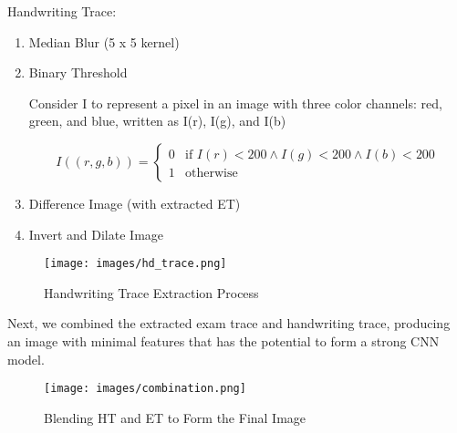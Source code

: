 \documentclass[pmlr,twocolumn,10pt,breaklinks, x11names,table]{jmlr} %
\begin{document}
\vfill\eject

Handwriting Trace:

\begin{enumerate}
\item Median Blur (5 x 5 kernel)
\item Binary Threshold

Consider I to represent a pixel in an image with three color channels: red, green, and blue, written as I(r), I(g), and I(b)

\[I((r, g, b)) = \begin{cases} 
    0 & \text{if } I(r) < 200 \land I(g) < 200 \land I(b) < 200 \\
    1 & \text{otherwise}
\end{cases}\]

\item Difference Image (with extracted ET)
\item Invert and Dilate Image
\end{enumerate}

\begin{figure}[h] 
\label{fig: fig3}
\centering 
\texttt{[image: images/hd\_trace.png]}
\caption{Handwriting Trace Extraction Process}
\end{figure}

\clearpage

Next, we combined the extracted exam trace and handwriting trace, producing an image with minimal features that has the potential to form a strong CNN model.

\begin{figure} [h]
\label{fig:fig4}
\centering 
\texttt{[image: images/combination.png]}
\caption{Blending HT and ET to Form the Final Image}
\end{figure}
\end{document}
